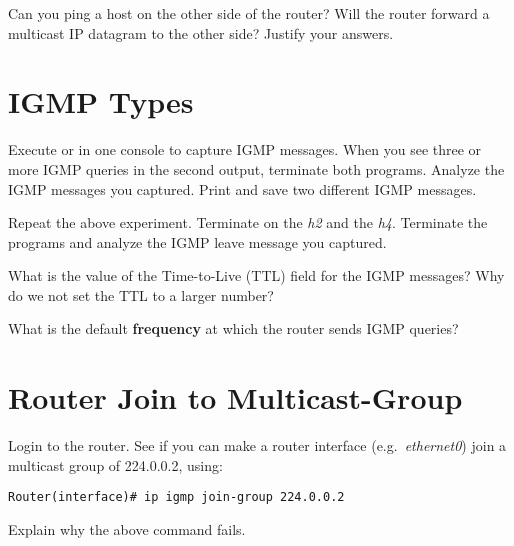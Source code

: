 \documentclass{../UTNetLab}
\begin{document}
    \begin{report}
        \item Can you ping a host on the other side of the router?
            Will the router forward a multicast IP datagram to the other side?
            Justify your answers.
    \end{report}

\section{IGMP Types}
    Execute  or  in one console to capture IGMP messages.
    When you see three or more IGMP queries in the second  output, terminate both  programs.
    Analyze the IGMP messages you captured.
    Print and save two different IGMP messages.

    Repeat the above experiment.
    Terminate  on the \textit{h2} and the \textit{h4}.
    Terminate the  programs and analyze the IGMP leave message you captured.
    
    \begin{report}
        \item What is the value of the Time-to-Live (TTL) field for the IGMP messages?
            Why do we not set the TTL to a larger number?

        \item What is the default \textbf{frequency} at which the router sends IGMP queries?
    \end{report}

\section{Router Join to Multicast-Group}
    Login to the router.
    See if you can make a router interface (e.g.\ \textit{ethernet0}) join a multicast group of 224.0.0.2, using:
    \begin{lstlisting}[language={cisco}]
Router(interface)# ip igmp join-group 224.0.0.2
    \end{lstlisting}
    
    \begin{report}
        \item Explain why the above command fails.
    \end{report}
\end{document}
